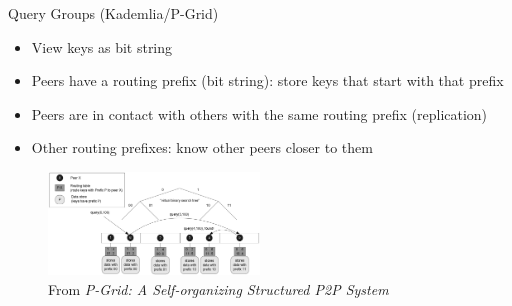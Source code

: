 \documentclass[presentation,english,usenames,dvipsnames]{beamer}
\begin{document}
\begin{frame}{Query Groups (Kademlia/P-Grid)}
  \begin{itemize}
    \item View keys as bit string
    \item Peers have a routing prefix (bit string): store keys that start with
          that prefix
    \item Peers are in contact with others with the same routing prefix
          (replication)
    \item Other routing prefixes: know other peers closer to them
  \end{itemize}
  \begin{figure}
    \centering
    \includegraphics[width=0.5\textwidth]{figures/p-grid}
    \caption*{\tiny From \emph{P-Grid: A Self-organizing Structured P2P System}}
  \end{figure}
\end{frame}
\end{document}

